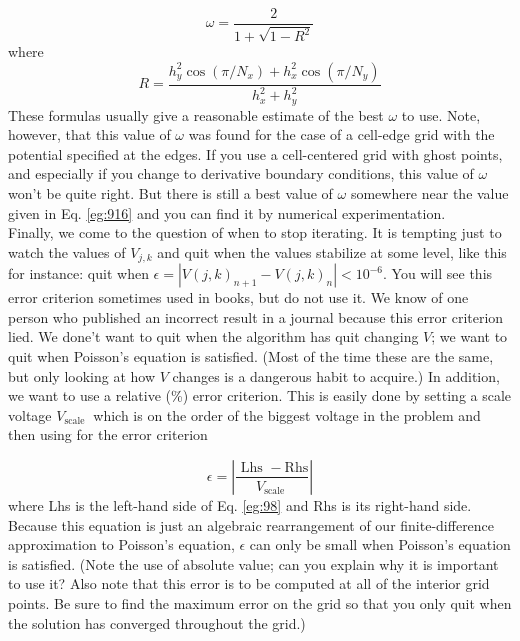 \documentclass{book}
\theoremstyle{plain}
\theoremstyle{definition}
\numberwithin{exm}{chapter}
\theoremstyle{remark}
\theoremstyle{summary}
\theoremstyle{overview}
\begin{document}
\begin{equation}\label{eq:916}
\omega=\frac{2}{1+\sqrt{1-R^{2}}}
\end{equation}
where
\begin{equation}\label{eq:917}
R=\frac{h_{y}^{2} \cos \left(\pi / N_{x}\right)+h_{x}^{2} \cos \left(\pi / N_{y}\right)}{h_{x}^{2}+h_{y}^{2}}
\end{equation}
These formulas usually give a reasonable estimate of the best $\omega$ to use. Note,
however, that this value of $\omega$ was found for the case of a cell-edge grid with the
potential specified at the edges. If you use a cell-centered grid with ghost points,
and especially if you change to derivative boundary conditions, this value of $\omega$
won\rq t be quite right. But there is still a best value of $\omega$ somewhere near the value
given in Eq. \eqref{eg:916} and you can find it by numerical experimentation. \\ 
Finally, we come to the question of when to stop iterating. It is tempting just to watch the values of $V_{j, k}$ and quit when the values stabilize at some level, like this for instance: quit when $\epsilon=\left|V(j, k)_{n+1}-V(j, k)_{n}\right|<10^{-6}$. You will see this error criterion sometimes used in books, but do not use it. We know of one person who published an incorrect result in a journal because this error criterion lied. We done\rq t want to quit when the algorithm has quit changing $V$; we want to quit when Poisson\rq s equation is satisfied. (Most of the time these are the same, but only looking at how $V$ changes is a dangerous habit to acquire.) In addition, we want to use a relative (\%) error criterion. This is easily done by setting a scale voltage $V_{\text {scale }}$ which is on the order of the biggest voltage in the problem and then using for the error criterion

\begin{equation}\label{eq:918}
\epsilon=\left|\frac{\text { Lhs }-\mathrm{Rhs}}{V_{\text {scale }}}\right|
\end{equation}
where Lhs is the left-hand side of Eq. \eqref{eg:98} and Rhs is its right-hand side. Because this equation is just an algebraic rearrangement of our finite-difference approximation to Poisson\rq s equation, $\epsilon$ can only be small when Poisson\rq s equation is satisfied. (Note the use of absolute value; can you explain why it is important to use it? Also note that this error is to be computed at all of the interior grid points. Be sure to find the maximum error on the grid so that you only quit when the solution has converged throughout the grid.)\\
\end{document}
